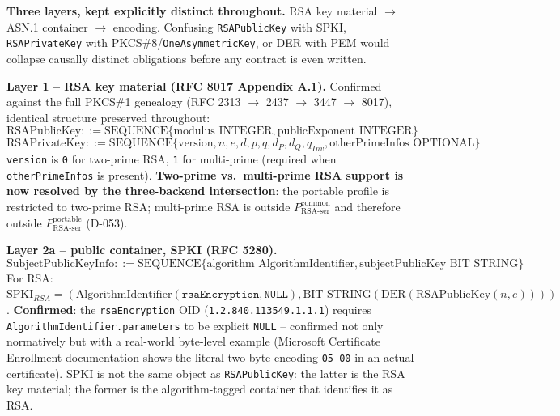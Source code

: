 \documentclass[11pt,a4paper]{article}
\begin{document}
\textbf{Three layers, kept explicitly distinct throughout.} RSA key material $\to$ ASN.1 container $\to$ encoding. Confusing \texttt{RSAPublicKey} with SPKI, \texttt{RSAPrivateKey} with PKCS\#8/\texttt{OneAsymmetricKey}, or DER with PEM would collapse causally distinct obligations before any contract is even written.

\textbf{Layer 1 -- RSA key material (RFC 8017 Appendix A.1).} Confirmed against the full PKCS\#1 genealogy (RFC 2313 $\to$ 2437 $\to$ 3447 $\to$ 8017), identical structure preserved throughout:
\[\text{RSAPublicKey} ::= \text{SEQUENCE} \{ \text{modulus INTEGER}, \text{publicExponent INTEGER} \}\]
\[\text{RSAPrivateKey} ::= \text{SEQUENCE} \{ \text{version}, n, e, d, p, q, d_P, d_Q, q_{Inv}, \text{otherPrimeInfos OPTIONAL} \}\]
\texttt{version} is \texttt{0} for two-prime RSA, \texttt{1} for multi-prime (required when \texttt{otherPrimeInfos} is present). \textbf{Two-prime vs.\ multi-prime RSA support is now resolved by the three-backend intersection}: the portable profile is restricted to two-prime RSA; multi-prime RSA is outside $P_{\mathrm{RSA\text{-}ser}}^{\mathrm{common}}$ and therefore outside $P_{\mathrm{RSA\text{-}ser}}^{\mathrm{portable}}$ (D-053).

\textbf{Layer 2a -- public container, SPKI (RFC 5280).}
\[\text{SubjectPublicKeyInfo} ::= \text{SEQUENCE} \{ \text{algorithm AlgorithmIdentifier}, \text{subjectPublicKey BIT STRING} \}\]
For RSA: $\text{SPKI}_{RSA} = (\text{AlgorithmIdentifier}(\texttt{rsaEncryption}, \texttt{NULL}), \text{BIT STRING}(\text{DER}(\text{RSAPublicKey}(n,e))))$. \textbf{Confirmed}: the \texttt{rsaEncryption} OID (\texttt{1.2.840.113549.1.1.1}) requires \texttt{AlgorithmIdentifier.parameters} to be explicit \texttt{NULL} -- confirmed not only normatively but with a real-world byte-level example (Microsoft Certificate Enrollment documentation shows the literal two-byte encoding \texttt{05 00} in an actual certificate). SPKI is not the same object as \texttt{RSAPublicKey}: the latter is the RSA key material; the former is the algorithm-tagged container that identifies it as RSA.
\end{document}
